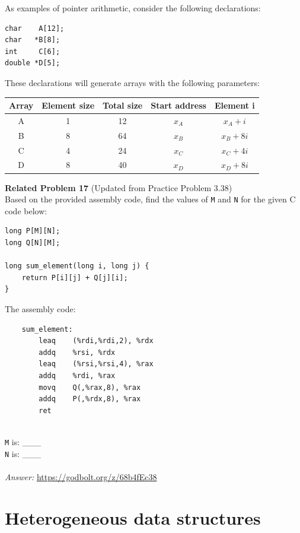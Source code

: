 \documentclass{article}
\begin{document}
As examples of pointer arithmetic, consider the following declarations:

\begin{verbatim}
char    A[12];
char   *B[8];
int     C[6];
double *D[5];
\end{verbatim}

These declarations will generate arrays with the following parameters:

\begin{table}[h]
    \centering
    \begin{tabular}{c c c c c}
        \toprule
        \textbf{Array} & \textbf{Element size} & \textbf{Total size} & \textbf{Start address} & \textbf{Element i} \\
        \midrule
        A & 1  & 12  & \( x_A \)  & \( x_A + i \) \\
        B & 8  & 64  & \( x_B \)  & \( x_B + 8i \) \\
        C & 4  & 24  & \( x_C \)  & \( x_C + 4i \) \\
        D & 8  & 40  & \( x_D \)  & \( x_D + 8i \) \\
        \bottomrule
    \end{tabular}
\end{table}

\noindent\textbf{Related Problem 17} (Updated from Practice Problem 3.38) \\
Based on the provided assembly code, find the values of \texttt{M} and \texttt{N} for the given C code below:
\begin{verbatim}
long P[M][N];
long Q[N][M];

long sum_element(long i, long j) {
    return P[i][j] + Q[j][i];
}
\end{verbatim}
The assembly code:
\begin{verbatim}
    sum_element:
        leaq    (%rdi,%rdi,2), %rdx
        addq    %rsi, %rdx
        leaq    (%rsi,%rsi,4), %rax
        addq    %rdi, %rax
        movq    Q(,%rax,8), %rax
        addq    P(,%rdx,8), %rax
        ret
\end{verbatim}
\\
\texttt{M} is: \_\_\_ \\
\texttt{N} is: \_\_\_ \\
\\
\textit{Answer: }\url{https://godbolt.org/z/68b4fEc38} \\
\clearpage
\section{Heterogeneous data structures}
\end{document}
